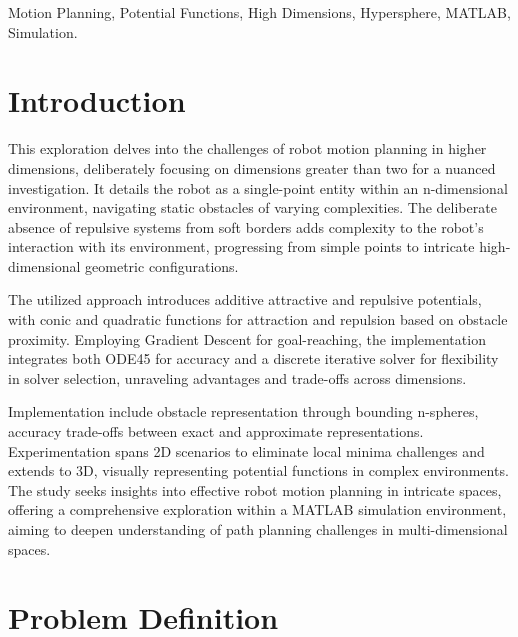 \documentclass{IEEEtaes}
\begin{document}
{\begin{IEEEkeywords}Motion Planning, Potential Functions, High Dimensions, Hypersphere, MATLAB, Simulation.
\end{IEEEkeywords}
\vfill\null




\section{\large \textbf{Introduction}}


{\scshape T}his exploration delves into the challenges of robot motion planning in higher dimensions, deliberately focusing on dimensions greater than two for a nuanced investigation. It details the robot as a single-point entity within an n-dimensional environment, navigating static obstacles of varying complexities. The deliberate absence of repulsive systems from soft borders adds complexity to the robot's interaction with its environment, progressing from simple points to intricate high-dimensional geometric configurations.

The utilized approach introduces additive attractive and repulsive potentials, with conic and quadratic functions for attraction and repulsion based on obstacle proximity. Employing Gradient Descent for goal-reaching, the implementation integrates both ODE45 for accuracy and a discrete iterative solver for flexibility in solver selection, unraveling advantages and trade-offs across dimensions.

Implementation include obstacle representation through bounding n-spheres, accuracy trade-offs between exact and approximate representations. Experimentation spans 2D scenarios to eliminate local minima challenges and extends to 3D, visually representing potential functions in complex environments. The study seeks insights into effective robot motion planning in intricate spaces, offering a comprehensive exploration within a MATLAB simulation environment, aiming to deepen understanding of path planning challenges in multi-dimensional spaces.
\section{\large \textbf{Problem Definition}}

\begin{figure}[t!]
    \centering
    \vspace{0.5em}
\end{figure}

}
\end{document}
